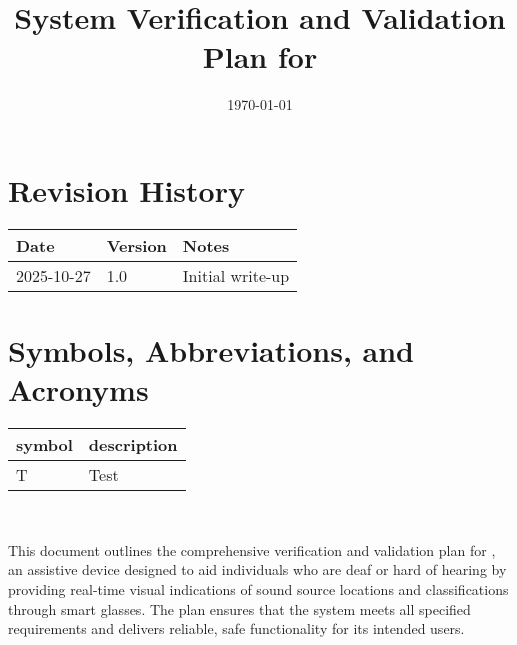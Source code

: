 \documentclass[12pt, titlepage]{article}
\begin{document}
\title{System Verification and Validation Plan for \progname{}} 
\author{\authname}
\date{\today}
	
\maketitle




\section*{Revision History}

\begin{tabularx}{\textwidth}{|p{3cm}|p{2cm}|X|}
\hline
{\bf Date} & {\bf Version} & {\bf Notes}\\
\hline
2025-10-27 & 1.0 & Initial write-up\\
\hline
\end{tabularx}

\newpage

\tableofcontents

\listoftables

\listoffigures
{}

\newpage

\section{Symbols, Abbreviations, and Acronyms}

\renewcommand{\arraystretch}{1.2}
\begin{tabular}{|l|l|} 
  \hline	
  \textbf{symbol} & \textbf{description}\\
  \hline
  T & Test\\
  \hline
\end{tabular}\\



\newpage


This document outlines the comprehensive verification and validation plan for \progname{}, an assistive device designed to aid individuals who are deaf or hard of hearing by providing real-time visual indications of sound source locations and classifications through smart glasses. The plan ensures that the system meets all specified requirements and delivers reliable, safe functionality for its intended users.
\end{document}
